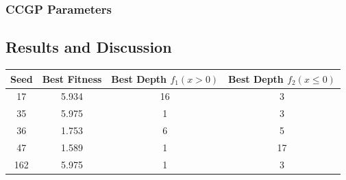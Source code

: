 \documentclass{article}
\begin{document}
\subsubsection*{CCGP Parameters}
\subsection*{Results and Discussion}

\begin{center}
	\begin{tabular}{|c|c|c|c|}
		\hline
		Seed & Best Fitness & Best Depth $f_1(x > 0)$ & Best Depth $f_2(x \le 0)$ \\
		\hline
		17 & 5.934 & 16 & 3 \\
		\hline
		35 & 5.975 & 1 & 3 \\
		\hline
		36 & 1.753 & 6 & 5 \\
		\hline
		47 & 1.589 & 1 & 17 \\
		\hline
		162 & 5.975 & 1 & 3 \\
		\hline
	\end{tabular}
\end{center}
\end{document}
